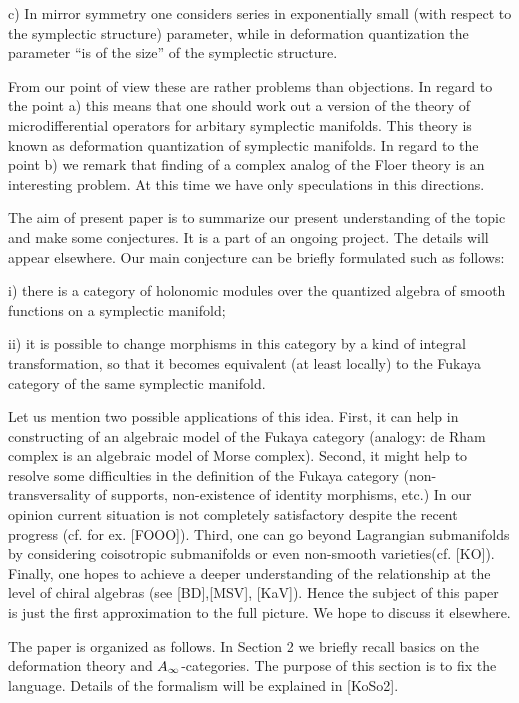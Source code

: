 \documentclass[a4paper,12pt]{article}
\begin{document}
c) In mirror symmetry one considers series in exponentially small (with respect to
the symplectic structure) parameter, while in deformation quantization
the parameter ``is of the size'' of the symplectic structure.


From our point of view these are rather problems  than objections.
In regard to the point a)  this means that one should work
out a version of the theory of microdifferential operators
for arbitary symplectic manifolds. 
 This theory is known as deformation
quantization of symplectic manifolds. 
In regard to the point b) we remark that
finding of a complex analog of the Floer theory is 
an interesting problem. At this time we have only speculations
in this directions. 

The aim of present paper is to summarize our present understanding 
of the topic and make some conjectures. It is a part of an ongoing project.
The details will appear elsewhere.
Our main conjecture can be briefly formulated such as follows:

i) there is a category of holonomic modules over the
 quantized  algebra of smooth functions
on a symplectic manifold;

ii) it is possible to change morphisms in this category by a kind of integral
transformation,
so that it becomes equivalent (at least locally) to the Fukaya
category of the same symplectic manifold.


Let us mention two possible applications of this idea.
First, it can help in constructing of an  algebraic model of the Fukaya category
(analogy: de Rham complex is an algebraic model of Morse complex).
Second, it might help to resolve some difficulties
in the definition of the Fukaya category (non-transversality
of supports, non-existence of identity morphisms, etc.)
In our opinion current situation is not completely satisfactory
despite
the recent progress (cf. for ex. [FOOO]).
Third, one can go beyond Lagrangian submanifolds by considering
coisotropic submanifolds or even non-smooth varieties(cf. [KO]).
Finally, one hopes to achieve a deeper understanding
of the relationship at the level of chiral algebras (see 
[BD],[MSV], [KaV]). Hence the 
subject of this paper is just the first approximation
to the full picture. We hope to discuss it
elsewhere.

The paper is organized as follows. In Section 2 
we briefly recall basics on the deformation theory and $A_{\infty}$-categories.
The purpose of this section is to fix the language.
Details of the formalism will be explained in [KoSo2].
\end{document}

